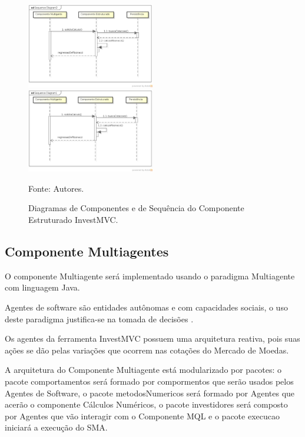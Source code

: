 \begin{figure}[htp]
\centering
\includegraphics[width=0.5\textwidth]{figuras/componenteEstruturado}
\includegraphics[width=0.5\textwidth]{figuras/sequenciaEstruturado}
\caption{Diagramas de Componentes e de Sequência do Componente Estruturado InvestMVC.}{Fonte: Autores.} 
\label{sequenciaEstruturado}
\end{figure}

\subsection{Componente Multiagentes}

O componente Multiagente será implementado usando o paradigma Multiagente com linguagem Java. 

Agentes de software são entidades autônomas e com capacidades sociais, o uso deste paradigma justifica-se na tomada de decisões \cite{agentBuilderWhy}. 

Os agentes da ferramenta  InvestMVC possuem uma arquitetura reativa, pois suas ações se dão pelas variações que ocorrem nas cotações do Mercado de Moedas.

A arquitetura do Componente Multiagente está modularizado por pacotes: o pacote comportamentos será formado por compormentos que serão usados pelos Agentes de Software, o pacote metodosNumericos será formado por Agentes que acerão o componente Cálculos Numéricos, o pacote investidores será composto por Agentes que vão interagir com o Componente MQL e o pacote execucao iniciará a execução do SMA.


